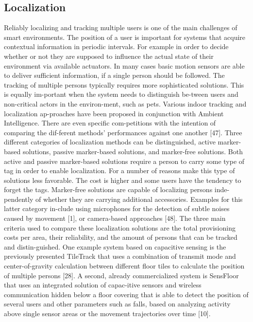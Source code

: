 \subsection{Localization}
Reliably localizing and tracking multiple users is one of the main challenges of smart environments. The position of a user is important for systems that acquire contextual information in periodic intervals. For example in order to decide whether or not they are supposed to influence the actual state of their environment via available actuators. In many cases basic motion sensors are able to deliver sufficient information, if a single person should be followed. The tracking of multiple persons typically requires more sophisticated solutions. This is equally im-portant when the system needs to distinguish be-tween users and non-critical actors in the environ-ment, such as pets.
Various indoor tracking and localization ap-proaches have been proposed in conjunction with Ambient Intelligence. There are even specific com-petitions with the intention of comparing the dif-ferent methods’ performances against one another [47]. Three different categories of localization methods can be distinguished, active marker-based solutions, passive marker-based solutions, and marker-free solutions. Both active and passive marker-based solutions require a person to carry some type of tag in order to enable localization. For a number of reasons make this type of solutions less favorable. The cost is higher and some users have the tendency to forget the tags. Marker-free solutions are capable of localizing persons inde-pendently of whether they are carrying additional accessories. Examples for this latter category in-clude using microphones for the detection of subtle noises caused by movement [1], or camera-based approaches [48]. The three main criteria used to compare these localization solutions are the total provisioning costs per area, their reliability, and the amount of persons that can be tracked and distin-guished. One example system based on capacitive sensing is the previously presented TileTrack that uses a combination of transmit mode and center-of-gravity calculation between different floor tiles to calculate the position of multiple persons [28]. A second, already commercialized system is SensFloor that uses an integrated solution of capac-itive sensors and wireless communication hidden below a floor covering that is able to detect the position of several users and other parameters such as falls, based on analyzing activity above single sensor areas or the movement trajectories over time [10].

